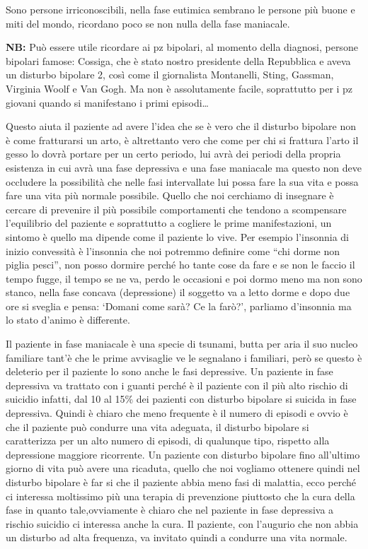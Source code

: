 \begin{itemize}
Sono persone irriconoscibili, nella fase eutimica sembrano le persone
più buone e miti del mondo, ricordano poco se non nulla della fase
maniacale.

\textbf{NB:} Può essere utile ricordare ai pz bipolari, al momento della
diagnosi, persone bipolari famose: Cossiga, che è stato nostro
presidente della Repubblica e aveva un disturbo bipolare 2, così come il
giornalista Montanelli, Sting, Gassman, Virginia Woolf e Van Gogh. Ma
non è assolutamente facile, soprattutto per i pz giovani quando si
manifestano i primi episodi\ldots{}

Questo aiuta il paziente ad avere l'idea che se è vero che il disturbo
bipolare non è come fratturarsi un arto, è altrettanto vero che come per
chi si frattura l'arto il gesso lo dovrà portare per un certo periodo,
lui avrà dei periodi della propria esistenza in cui avrà una fase
depressiva e una fase maniacale ma questo non deve occludere la
possibilità che nelle fasi intervallate lui possa fare la sua vita e
possa fare una vita più normale possibile. Quello che noi cerchiamo di
insegnare è cercare di prevenire il più possibile comportamenti che
tendono a scompensare l'equilibrio del paziente e soprattutto a cogliere
le prime manifestazioni, un sintomo è quello ma dipende come il paziente
lo vive. Per esempio l'insonnia di inizio convessità è l'insonnia che
noi potremmo definire come ``chi dorme non piglia pesci'', non posso
dormire perché ho tante cose da fare e se non le faccio il tempo fugge,
il tempo se ne va, perdo le occasioni e poi dormo meno ma non sono
stanco, nella fase concava (depressione) il soggetto va a letto dorme e
dopo due ore si sveglia e pensa: `Domani come sarà? Ce la farò?',
parliamo d'insonnia ma lo stato d'animo è differente.

Il paziente in fase maniacale è una specie di tsunami, butta per aria il
suo nucleo familiare tant'è che le prime avvisaglie ve le segnalano i
familiari, però se questo è deleterio per il paziente lo sono anche le
fasi depressive. Un paziente in fase depressiva va trattato con i guanti
perché è il paziente con il più alto rischio di suicidio infatti, dal 10
al 15\% dei pazienti con disturbo bipolare si suicida in fase
depressiva. Quindi è chiaro che meno frequente è il numero di episodi e
ovvio è che il paziente può condurre una vita adeguata, il disturbo
bipolare si caratterizza per un alto numero di episodi, di qualunque
tipo, rispetto alla depressione maggiore ricorrente. Un paziente con
disturbo bipolare fino all'ultimo giorno di vita può avere una ricaduta,
quello che noi vogliamo ottenere quindi nel disturbo bipolare è far si
che il paziente abbia meno fasi di malattia, ecco perché ci interessa
moltissimo più una terapia di prevenzione piuttosto che la cura della
fase in quanto tale,ovviamente è chiaro che nel paziente in fase
depressiva a rischio suicidio ci interessa anche la cura. Il paziente,
con l'augurio che non abbia un disturbo ad alta frequenza, va invitato
quindi a condurre una vita normale.


\end{itemize}
